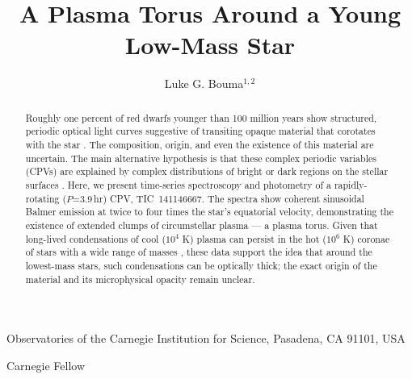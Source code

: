 \documentclass{nature3}
\title{A Plasma Torus Around a Young Low-Mass Star}
\newcommand{\carnegie}{Observatories of the Carnegie Institution for Science, Pasadena, CA 91101, USA}
\begin{document}
\author{Luke G. Bouma$^{1,2}$}

\maketitle

\scriptsize
\begin{affiliations}
\item \carnegie
\item Carnegie Fellow
\end{affiliations}
\normalsize


\begin{abstract}
\normalfont
Roughly one percent of red dwarfs younger than 100 million years
show structured, periodic optical light curves suggestive of
transiting opaque material that corotates with the star
\cite{Rebull2016,Stauffer2017,Rebull2018,Bouma2024}.  The
composition, origin, and even the existence of this material are
uncertain. The main alternative hypothesis is that these complex
periodic variables (CPVs) are explained by complex distributions of
bright or dark regions on the stellar surfaces
\cite{Koen2021}.  Here, we present time-series spectroscopy and
photometry of a rapidly-rotating ($P$=3.9\,hr)
CPV, TIC~141146667. The spectra show coherent sinusoidal Balmer
emission at twice to four times the star's equatorial velocity,
demonstrating the existence of extended clumps of circumstellar
plasma --- a plasma torus.  Given that long-lived condensations of
cool ($10^4$ K) plasma can persist in the hot ($10^6$ K) coronae of
stars with a wide range of masses
\cite{CollierCameron1989,Townsend2005,Dunstone2006,Petit2013,Waugh2022,Daley-Yates2024},
these data support the idea that around the lowest-mass stars, such
condensations can be optically thick; the exact origin of the
material and its microphysical opacity remain unclear.
\end{abstract}

\maketitle


\end{document}
